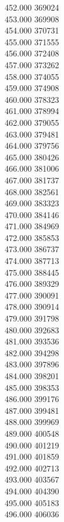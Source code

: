 { 452.000	369024 \\
 453.000	369908 \\
 454.000	370731 \\
 455.000	371555 \\
 456.000	372408 \\
 457.000	373262 \\
 458.000	374055 \\
 459.000	374908 \\
 460.000	378323 \\
 461.000	378994 \\
 462.000	379055 \\
 463.000	379481 \\
 464.000	379756 \\
 465.000	380426 \\
 466.000	381006 \\
 467.000	381737 \\
 468.000	382561 \\
 469.000	383323 \\
 470.000	384146 \\
 471.000	384969 \\
 472.000	385853 \\
 473.000	386737 \\
 474.000	387713 \\
 475.000	388445 \\
 476.000	389329 \\
 477.000	390091 \\
 478.000	390914 \\
 479.000	391798 \\
 480.000	392683 \\
 481.000	393536 \\
 482.000	394298 \\
 483.000	397896 \\
 484.000	398201 \\
 485.000	398353 \\
 486.000	399176 \\
 487.000	399481 \\
 488.000	399969 \\
 489.000	400548 \\
 490.000	401219 \\
 491.000	401859 \\
 492.000	402713 \\
 493.000	403567 \\
 494.000	404390 \\
 495.000	405183 \\
 496.000	406036 \\
}

